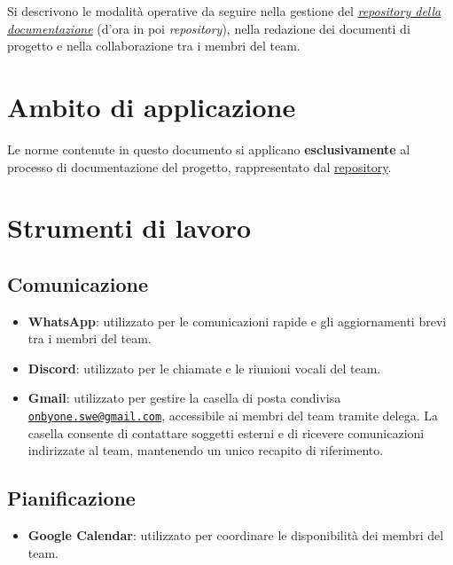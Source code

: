 \documentclass[11pt, a4paper]{article}
\begin{document}
Si descrivono le modalità operative da seguire nella gestione del \href{https://github.com/On-By-One-Team/On-By-One.github.io}{\textit{repository della documentazione}} (d'ora in poi \textit{repository}), nella redazione dei documenti di progetto e nella collaborazione tra i membri del team.

\section{Ambito di applicazione}

Le norme contenute in questo documento si applicano \textbf{esclusivamente} al processo di documentazione del progetto, rappresentato dal \href{https://github.com/On-By-One-Team/On-By-One.github.io}{repository}.

\section{Strumenti di lavoro}

\subsection{Comunicazione}
\begin{itemize}
    \item \textbf{WhatsApp}: utilizzato per le comunicazioni rapide e gli aggiornamenti brevi tra i membri del team.
    \item \textbf{Discord}: utilizzato per le chiamate e le riunioni vocali del team.
    \item \textbf{Gmail}: utilizzato per gestire la casella di posta condivisa \href{mailto:onbyone.swe@gmail.com}{\texttt{onbyone.swe@gmail.com}}, accessibile ai membri del team tramite delega. La casella consente di contattare soggetti esterni e di ricevere comunicazioni indirizzate al team, mantenendo un unico recapito di riferimento.
\end{itemize}

\subsection{Pianificazione}
\begin{itemize}
    \item \textbf{Google Calendar}: utilizzato per coordinare le disponibilità dei membri del team.
\end{itemize}
\end{document}
